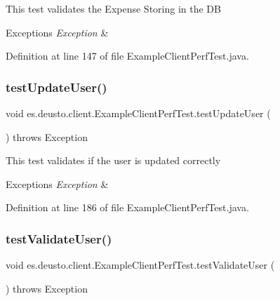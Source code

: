 This test validates the Expense Storing in the DB 
\begin{DoxyExceptions}{Exceptions}
{\em Exception} & \\
\hline
\end{DoxyExceptions}


Definition at line 147 of file Example\+Client\+Perf\+Test.\+java.

\mbox{\label{classes_1_1deusto_1_1client_1_1_example_client_perf_test_a625db2684f92cc0f941f5b9282facbcd}} 
\subsubsection{\texorpdfstring{test\+Update\+User()}{testUpdateUser()}}
{\footnotesize\ttfamily void es.\+deusto.\+client.\+Example\+Client\+Perf\+Test.\+test\+Update\+User (\begin{DoxyParamCaption}{ }\end{DoxyParamCaption}) throws Exception}

This test validates if the user is updated correctly 
\begin{DoxyExceptions}{Exceptions}
{\em Exception} & \\
\hline
\end{DoxyExceptions}


Definition at line 186 of file Example\+Client\+Perf\+Test.\+java.

\mbox{\label{classes_1_1deusto_1_1client_1_1_example_client_perf_test_a0a7c514b8bfc7b86ae4e19a52b5302c8}} 
\subsubsection{\texorpdfstring{test\+Validate\+User()}{testValidateUser()}}
{\footnotesize\ttfamily void es.\+deusto.\+client.\+Example\+Client\+Perf\+Test.\+test\+Validate\+User (\begin{DoxyParamCaption}{ }\end{DoxyParamCaption}) throws Exception}

